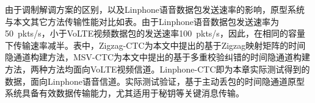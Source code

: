 
由于调制解调方案的区别，以及Linphone语音数据包发送速率的影响，原型系统与本文其它方法传输性能对比如表。由于Linphone语音数据包发送速率为{50\ pkts/s}，小于VoLTE视频数据包的发送速率{100\ pkts/s}，因此，在相同的容量下传输速率减半。表中，Zigzag-CTC为本文中提出的基于Zigzag映射矩阵的时间隐通道构建方法，MSV-CTC为本文中提出的基于多重校验纠错的时间隐通道构建方法，两种方法均面向VoLTE视频信道。Linphone-CTC即为本章实际测试得到的数据，面向Linphone语音信道。实际测试验证，基于主动丢包的时间隐通道原型系统具备有效数据传输能力，尤其适用于秘钥等关键消息传输。